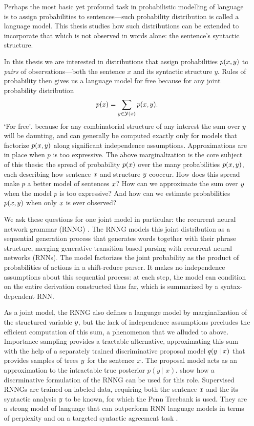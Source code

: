 Perhaps the most basic yet profound task in probabilistic modelling of language is to assign probabilities to sentences---such probability distribution is called a language model. This thesis studies how such distributions can be extended to incorporate that which is not observed in words alone: the sentence's syntactic structure.

In this thesis we are interested in distributions that assign probabilities $p(x, y)$ to \textit{pairs} of observations---both the sentence $x$ and its syntactic structure $y$. Rules of probability then gives us a language model for free because for any joint probability distribution
\begin{align*}
  p(x) = \sum_{y \in \mathcal{Y}(x)} p(x, y).
\end{align*}
`For free', because for any combinatorial structure of any interest the sum over $y$ will be daunting, and can generally be computed exactly only for models that factorize $p(x, y)$ along significant independence assumptions. Approximations are  in place when $p$ is too expressive. The above marginalization is the core subject of this thesis: the spread of probability $p(x)$ over the many probabilities $p(x, y)$, each describing how sentence $x$ and structure $y$ cooccur. How does this spread make $p$ a better model of sentences $x$? How can we approximate the sum over $y$ when the model $p$ is too expressive? And how can we estimate probabilities $p(x, y)$ when only $x$ is ever observed?

We ask these questions for one joint model in particular: the recurrent neural network grammar (RNNG) \citep{dyer2016rnng}. The RNNG models this joint distribution as a sequential generation process that generates words together with their phrase structure, merging generative transition-based parsing with recurrent neural networks (RNNs). The model factorizes the joint probability as the product of probabilities of actions in a shift-reduce parser. It makes no independence assumptions about this sequential process: at each step, the model can condition on the entire derivation constructed thus far, which is summarized by a syntax-dependent RNN.

As a joint model, the RNNG also defines a language model by marginalization of the structured variable $y$, but the lack of independence assumptions precludes the efficient computation of this sum, a phenomenon that we alluded to above. Importance sampling provides a tractable alternative, approximating this sum with the help of a separately trained discriminative proposal model $q(y \mid x)$ that provides samples of trees $y$ for the sentence $x$. The proposal model acts as an approximation to the intractable true posterior $p(y \mid x)$. \citet{dyer2016rnng} show how a discrminative formulation of the RNNG can be used for this role. Supervised RNNGs are trained on labeled data, requiring both the sentence $x$ and the its syntactic analysis $y$ to be known, for which the Penn Treebank \citep{marcus1993penn} is used. They are a strong model of language that can outperform RNN language models in terms of perplexity \citep{dyer2016rnng} and on a targeted syntactic agreement task \citep{kuncoro2018learn}.

